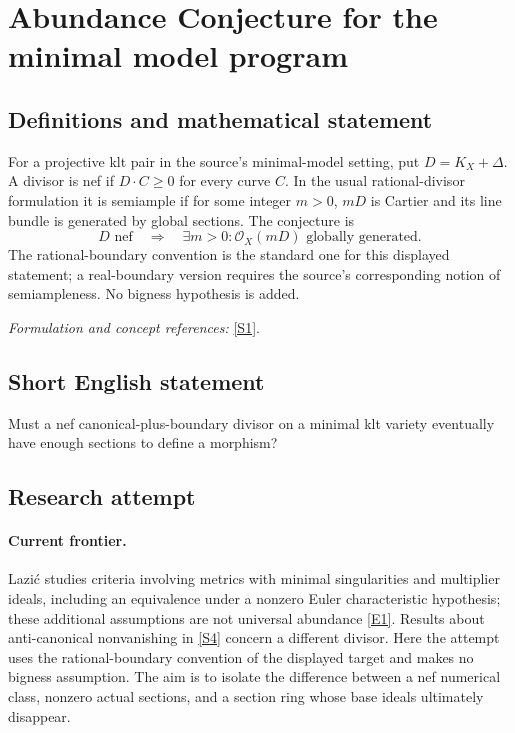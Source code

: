 \documentclass[11pt,a4paper]{article}
\numberwithin{equation}{section}
\newcommand{\sref}[2]{\hyperlink{source:#1:#2}{[S#2]}}
\newcommand{\eref}[2]{\hyperlink{extra:#1:#2}{[E#2]}}
\newif\ifshowcatalogue
\newcommand{\cataloguescope}[1]{\ifshowcatalogue
 \paragraph{Exact scope in the supplied catalogue.}
 \begin{quote}\small #1\end{quote}\fi}
\begin{document}
\setcounter{section}{77}
\section{\texorpdfstring{Abundance Conjecture for the minimal model program}{Abundance Conjecture for the minimal model program}}\label{78}
\subsection{Definitions and mathematical statement}
For a projective klt pair in the source's minimal-model setting, put $D=K_X+\Delta$. A divisor is nef if $D\cdot C\ge0$ for every curve $C$. In the usual rational-divisor formulation it is semiample if for some integer $m>0$, $mD$ is Cartier and its line bundle is generated by global sections. The conjecture is
\[
 D\text{ nef}\quad\Longrightarrow\quad \exists m>0:\mathcal O_X(mD)\text{ globally generated}.
\]
The rational-boundary convention is the standard one for this displayed statement; a real-boundary version requires the source's corresponding notion of semiampleness. No bigness hypothesis is added.
\par\smallskip\textit{Formulation and concept references:} \sref{78}{1}.
\cataloguescope{Prove that for every minimal projective Kawamata log terminal pair (X,Delta), the nef adjoint divisor K\_X+Delta is semiample.}
\subsection{Short English statement}
Must a nef canonical-plus-boundary divisor on a minimal klt variety eventually have enough sections to define a morphism?
\subsection{Research attempt}

\paragraph{Current frontier.}
Lazi\'c studies criteria involving metrics with minimal singularities and
multiplier ideals, including an equivalence under a nonzero Euler
characteristic hypothesis; these additional assumptions are not universal
abundance \eref{78}{1}. Results about anti-canonical nonvanishing in
\sref{78}{4} concern a different divisor. Here the attempt uses the
rational-boundary convention of the displayed target and makes no bigness
assumption. The aim is to isolate the difference between a nef numerical
class, nonzero actual sections, and a section ring whose base ideals
ultimately disappear.
\end{document}

